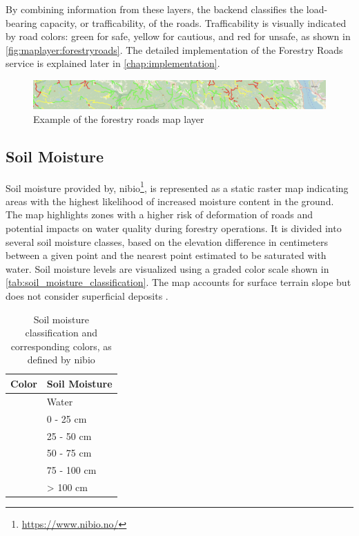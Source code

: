By combining information from these layers, the backend classifies the load-bearing capacity, or \gls{trafficability}, of the roads. Trafficability is visually indicated by road colors: green for safe, yellow for cautious, and red for unsafe, as shown in \autoref{fig:maplayer:forestryroads}. The detailed implementation of the Forestry Roads service is explained later in \autoref{chap:implementation}.

\begin{figure}[h]
\centering
\includegraphics[width=1\linewidth]{images/maplayers/forestryroad.png}
\caption{Example of the forestry roads map layer}
\label{fig:maplayer:forestryroads}
\end{figure}

\subsection{Soil Moisture}

Soil moisture provided by, \acrfull{nibio}\footnote{\url{https://www.nibio.no/}}, is represented as a static raster map indicating areas with the highest likelihood of increased moisture content in the ground. The map highlights zones with a higher risk of deformation of roads and potential impacts on water quality during forestry operations. It is divided into several soil moisture classes, based on the elevation difference in centimeters between a given point and the nearest point estimated to be saturated with water. Soil moisture levels are visualized using a graded color scale shown in \autoref{tab:soil_moisture_classification}. The map accounts for surface terrain slope but does not consider superficial deposits \cite{geonorge_soil_moisture}.

\begin{table}[h]
    \centering
    \begin{tabular}{|l|l|}
        \hline  
        \textbf{Color} & \textbf{Soil Moisture} \\
        \hline
        \cellcolor[HTML]{000080} & Water \\
        \hline
        \cellcolor[HTML]{0000ff} & 0 - 25 cm \\
        \hline
        \cellcolor[HTML]{1e90ff} & 25 - 50 cm \\
        \hline
        \cellcolor[HTML]{00bfff} & 50 - 75 cm \\
        \hline
        \cellcolor[HTML]{87cefa} & 75 - 100 cm \\
        \hline
        \cellcolor[HTML]{ffffff} & > 100 cm \\
        \hline
    \end{tabular}
    \caption[Soil moisture classification and corresponding colors]{Soil moisture classification and corresponding colors, as defined by \acrshort{nibio} \cite{geonorge_soil_moisture}}
    \label{tab:soil_moisture_classification}
\end{table}

